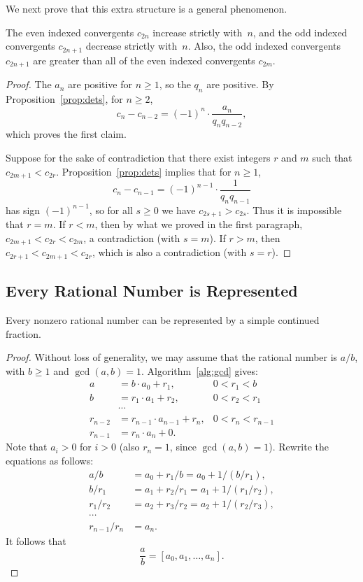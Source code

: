 We next prove that this extra structure is a general
phenomenon.

\begin{proposition}\label{prop:conv_incdec}%
%
The even indexed convergents $c_{2n}$ increase strictly with~$n$, and the
odd indexed convergents $c_{2n+1}$ decrease strictly with~$n$.  Also,
the odd indexed convergents $c_{2n+1}$ are greater than all of the
even indexed convergents $c_{2m}$.
\end{proposition}
\begin{proof}
The $a_n$ are positive for $n\geq 1$, so the $q_n$ are positive.
By Proposition~\ref{prop:dets}, for $n\geq 2$,
$$c_n - c_{n-2} = (-1)^n \cdot \frac{a_n}{q_n q_{n-2} },$$
which proves the first claim.

Suppose for the sake of contradiction that there exist
integers $r$ and $m$ such that $c_{2m+1} < c_{2r}$.
Proposition~\ref{prop:dets} implies that for $n\geq 1$,
$$
c_n - c_{n-1} = (-1)^{n-1}\cdot \frac{1}{q_n q_{n-1}}
$$
has sign $(-1)^{n-1}$, so for all $s\geq 0$ we have $c_{2s+1} >
c_{2s}$.  Thus it is impossible that $r= m$.  If $r<m$, then by
what we proved in the first paragraph,
$c_{2m+1} < c_{2r} < c_{2m}$, a contradiction (with $s=m$).  If $r>m$, then
$c_{2r+1} < c_{2m+1} < c_{2r}$, which is also a contradiction (with $s=r$).
\end{proof}


\subsection{Every Rational Number is Represented}
\begin{proposition}%
\label{prop:ratcf}%
  Every nonzero rational number can be represented by a simple
  continued fraction.
\end{proposition}
\begin{proof}
Without loss of generality, we may assume that the rational
number is $a/b$, with $b\geq 1$ and $\gcd(a,b)=1$.
Algorithm~\ref{alg:gcd} gives:
\begin{align*}
a &= b\cdot a_0 + r_1, & 0<r_1<b\\
b &= r_1\cdot a_1 + r_2, & 0<r_2<r_1\\
 &\cdots &\\
r_{n-2} &= r_{n-1}\cdot a_{n-1} + r_n, & 0<r_n < r_{n-1}\\
r_{n-1} &= r_n\cdot a_n + 0.
\end{align*}
Note that $a_i>0$ for $i>0$ (also $r_n=1$, since $\gcd(a,b)=1$).
Rewrite the equations as follows:
\begin{align*}
a/b &= a_0 + r_1/b = a_0 + 1/(b/r_1),\\
b/r_1 &= a_1 + r_2 / r_1 = a_1 + 1/(r_1/r_2),\\
r_1/r_2 &= a_2 + r_3 / r_2 = a_2 + 1/(r_2/r_3),\\
\cdots\\
r_{n-1}/r_n &= a_n.
\end{align*}
It follows that
$$
   \frac{a}{b} = [a_0,a_1,\ldots, a_n].
$$
\end{proof}

